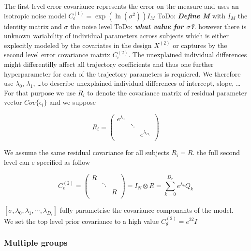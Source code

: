 \documentclass[final, paper=letter,5p,times,twocolumn]{elsarticle}
\newcommand{\ToDo}[1]{ToDo: \textbf{\textit{#1}}}
\theoremstyle{definition}
\begin{document}
The first level error covariance represents the error on the measure and uses an isotropic noise model $C_{\epsilon}^{(1)} = \exp(\ln(\sigma^{2}))I_{M}$ \ToDo{Define M} with $I_{M}$ the identity matrix and $\sigma$ the noise level \ToDo{what value for $\sigma$?}. however there is unknown variability of individual parameters across subjects which is either explecitly modeled by the covariates in the design $X^{(2)}$ or captures by the second level error covariance matrix $C_{\epsilon}^{(2)}$. The unexplained individual differences might differentilly affect all trajectory coefficients and thus one further hyperparameter for each of the trajectory parameters is requiered. We therefore use $\lambda_{0}$, $\lambda_{1}$, \dots to describe unexplained individual differences of intercept, slope, \dots For that purpose we use $R_{i}$ to denote the covariance matrix of residual parameter vector $Cov\{\epsilon_{i}\}$ and we suppose

\begin{equation}
  R_{i} =
  \left (
  \begin{array}{ccc}
    e^{\lambda_{0}} && \\
    & \ddots & \\
    && e^{\lambda_{D_{r}}}\\
  \end{array}
    \right )
  \label{Residual_covariance}
\end{equation}

We assume the same residual covariance for all subjects $R_{i} = R$. the full second level can e specified as follow

\begin{equation}
  C_{\epsilon}^{(2)} =
  \left (
  \begin{array}{ccc}
    R && \\
    & \ddots & \\
    && R\\
  \end{array}
    \right ) = I_{N} \otimes R = \sum_{k = 0}^{D_{r}} e^{\lambda_{k}} Q_{k}
  \label{Residual_second_level}
\end{equation}

$[\sigma, \lambda_{0}, \lambda_{1}, \cdots, \lambda_{D_{r}}]$ fully parametrise the covariance componants of the model. \\
We set the top level prior covariance to a high value $C_{\theta}^{(2)} = e^{32}I$

\subsubsection{Multiple groups}
\end{document}
